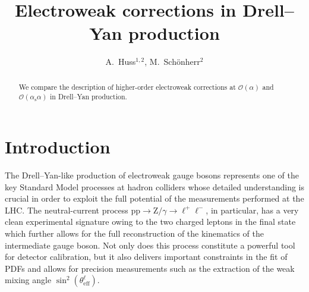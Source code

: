 \documentclass[11pt]{cernrep}
\newcommand{\order}{\ensuremath{\mathcal{O}}}
\newcommand{\alphas}{\ensuremath{\alpha_\mathrm{s}}}
\DeclareRobustCommand{\PZ}{{\ensuremath{\mathrm{Z}}}}
\DeclareRobustCommand{\Pl}{{\ensuremath{\ell}}}
\DeclareRobustCommand{\Plp}{{\ensuremath{\ell^+}}}
\DeclareRobustCommand{\Plm}{{\ensuremath{\ell^-}}}
\DeclareRobustCommand{\Pp}{{\ensuremath{\mathrm{p}}}}
\begin{document}
\title{Electroweak corrections in Drell--Yan production}

\author{
  A.\ Huss$^{1,2}$,
  M.\ Sch\"onherr$^2$
}

\maketitle

\begin{abstract}
  We compare the description of higher-order electroweak corrections at 
  $\order(\alpha)$ and $\order(\alphas\alpha)$ in Drell--Yan production.
\end{abstract}


\section{Introduction}
\label{sec:dyew:intro}

The Drell--Yan-like production of electroweak gauge bosons represents one of the key Standard Model processes at hadron colliders whose detailed understanding is crucial in order to exploit the full potential of the measurements performed at the LHC.
The neutral-current process $\Pp\Pp\to\PZ/\gamma\to\Plp\Plm$, in particular, has a very clean experimental signature owing to the two charged leptons in the final state which further allows for the full reconstruction of the kinematics of the intermediate gauge boson.
Not only does this process constitute a powerful tool for detector calibration, but it also delivers important constraints in the fit of PDFs and allows for precision measurements such as the extraction of the weak mixing angle $\sin^2(\theta^{\Pl}_\mathrm{eff})$.
\end{document}
